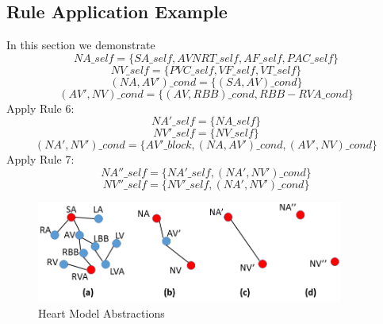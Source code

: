 \subsection{Rule Application Example}
In this section we demonstrate 
$$NA\_self=\{SA\_self,AVNRT\_self,AF\_self,PAC\_self\}$$
$$NV\_self=\{PVC\_self,VF\_self,VT\_self\}$$
$$(NA,AV')\_cond=\{(SA,AV)\_cond\}$$
$$(AV',NV)\_cond=\{(AV,RBB)\_cond,RBB-RVA\_cond\}$$
Apply Rule 6:
$$NA'\_self=\{NA\_self\}$$
$$NV'\_self=\{NV\_self\}$$
$$(NA',NV')\_cond=\{AV'\_block,(NA,AV')\_cond,(AV',NV)\_cond\}$$
Apply Rule 7:
$$NA''\_self=\{NA'\_self,(NA',NV')\_cond\}$$
$$NV''\_self=\{NV'\_self,(NA',NV')\_cond\}$$
\begin{figure}[!t]
		\centering
		\includegraphics[width=0.9\textwidth]{figs/abs.png}
		\caption{\small Heart Model Abstractions}
		\label{fig:abs_exam}
\end{figure}








